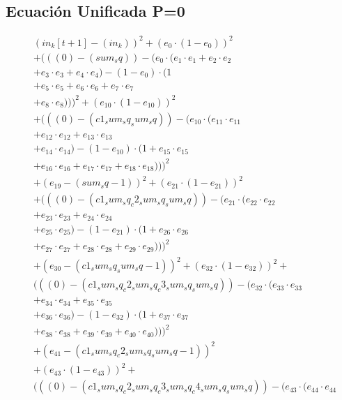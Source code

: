 \documentclass[10pt, a4paper]{article}
\begin{document}
\subsection*{Ecuación Unificada P=0}
\begin{align*}
& (in_k[t+1] - (in_k))^{2} + (e_{0} \cdot (1 - e_{0}))^{2} \\
& + (((0) - (sum_sq)) - (e_{0} \cdot (e_{1} \cdot e_{1} + e_{2} \cdot e_{2} \\
& + e_{3} \cdot e_{3} + e_{4} \cdot e_{4}) - (1 - e_{0}) \cdot (1 \\
& + e_{5} \cdot e_{5} + e_{6} \cdot e_{6} + e_{7} \cdot e_{7} \\
& + e_{8} \cdot e_{8})))^{2} + (e_{10} \cdot (1 - e_{10}))^{2} \\
& + (((0) - (c1_sum_sq_sum_sq)) - (e_{10} \cdot (e_{11} \cdot e_{11} \\
& + e_{12} \cdot e_{12} + e_{13} \cdot e_{13} \\
& + e_{14} \cdot e_{14}) - (1 - e_{10}) \cdot (1 + e_{15} \cdot e_{15} \\
& + e_{16} \cdot e_{16} + e_{17} \cdot e_{17} + e_{18} \cdot e_{18})))^{2} \\
& + (e_{19} - (sum_sq - 1))^{2} + (e_{21} \cdot (1 - e_{21}))^{2} \\
& + (((0) - (c1_sum_sq_c2_sum_sq_sum_sq)) - (e_{21} \cdot (e_{22} \cdot e_{22} \\
& + e_{23} \cdot e_{23} + e_{24} \cdot e_{24} \\
& + e_{25} \cdot e_{25}) - (1 - e_{21}) \cdot (1 + e_{26} \cdot e_{26} \\
& + e_{27} \cdot e_{27} + e_{28} \cdot e_{28} + e_{29} \cdot e_{29})))^{2} \\
& + (e_{30} - (c1_sum_sq_sum_sq - 1))^{2} + (e_{32} \cdot (1 - e_{32}))^{2} + \\
& (((0) - (c1_sum_sq_c2_sum_sq_c3_sum_sq_sum_sq)) - (e_{32} \cdot (e_{33} \cdot e_{33} \\
& + e_{34} \cdot e_{34} + e_{35} \cdot e_{35} \\
& + e_{36} \cdot e_{36}) - (1 - e_{32}) \cdot (1 + e_{37} \cdot e_{37} \\
& + e_{38} \cdot e_{38} + e_{39} \cdot e_{39} + e_{40} \cdot e_{40})))^{2} \\
& + (e_{41} - (c1_sum_sq_c2_sum_sq_sum_sq - 1))^{2} \\
& + (e_{43} \cdot (1 - e_{43}))^{2} + \\
& (((0) - (c1_sum_sq_c2_sum_sq_c3_sum_sq_c4_sum_sq_sum_sq)) - (e_{43} \cdot (e_{44} \cdot e_{44} \\

\end{align*}
\end{document}
